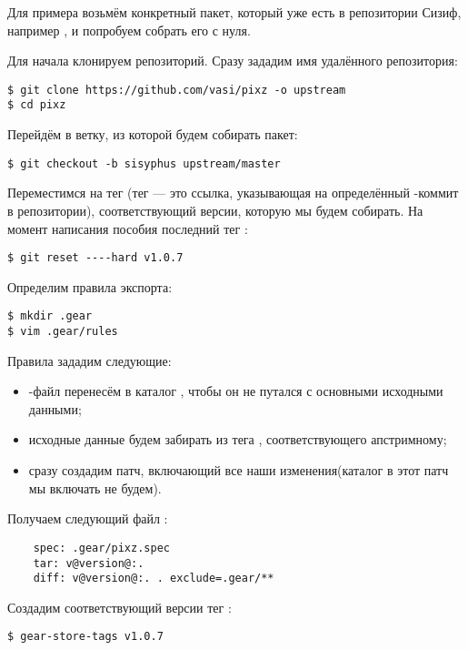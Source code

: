 
Для примера возьмём конкретный пакет, который уже есть в репозитории Сизиф, например , и попробуем
собрать его с нуля.

Для начала клонируем репозиторий. Сразу зададим имя удалённого репозитория:
\begin{verbatim}
$ git clone https://github.com/vasi/pixz -o upstream
$ cd pixz
\end{verbatim}

Перейдём в ветку, из которой будем собирать пакет:
\begin{verbatim}
$ git checkout -b sisyphus upstream/master
\end{verbatim}

Переместимся на тег (тег --- это ссылка, указывающая на определённый -коммит в репозитории),
соответствующий версии, которую мы будем собирать. На момент написания пособия последний тег :
\begin{verbatim}
$ git reset ----hard v1.0.7
\end{verbatim}

Определим правила экспорта:
\begin{verbatim}
$ mkdir .gear
$ vim .gear/rules
\end{verbatim}

Правила зададим следующие:
\begin{itemize}
	\item {}-файл перенесём в каталог , чтобы он не путался с основными исходными данными;
	\item исходные данные будем забирать из тега , соответствующего апстримному;
	\item сразу создадим патч, включающий все наши изменения(каталог  в этот патч мы включать не будем).
\end{itemize}

Получаем следующий файл :
\begin{verbatim}
    spec: .gear/pixz.spec
    tar: v@version@:.
    diff: v@version@:. . exclude=.gear/**
\end{verbatim}

Создадим соответствующий версии тег :
\begin{verbatim}
$ gear-store-tags v1.0.7
\end{verbatim}

